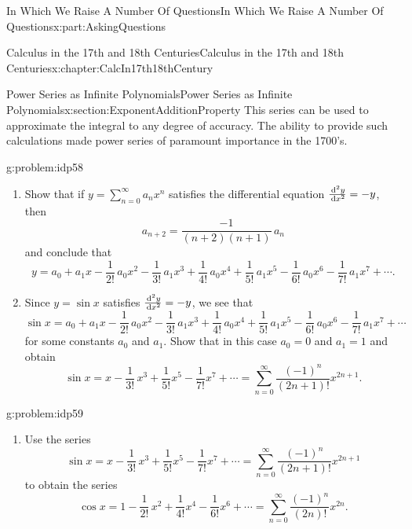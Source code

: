 \documentclass[oneside,10pt,]{book}
\numberwithin{equation}{section}
\newcommand{\dx}[1]{\,{\rm d}#1}
\begin{document}
\begin{partptx}{In Which We Raise A Number Of Questions}{}{In Which We Raise A Number Of Questions}{}{}{x:part:AskingQuestions}
\begin{chapterptx}{Calculus in the 17th and 18th Centuries}{}{Calculus in the 17th and 18th Centuries}{}{}{x:chapter:CalcIn17th18thCentury}
\begin{sectionptx}{Power Series as Infinite Polynomials}{}{Power Series as Infinite Polynomials}{}{}{x:section:ExponentAdditionProperty}
This series can be used to approximate the integral to any degree of accuracy. The ability to provide such calculations made power series of paramount importance in the 1700's.%
\begin{problem}{}{g:problem:idp58}%
\begin{enumerate}[font=\bfseries,label=(\alph*),ref=\alph*]
\item{}Show that if \(y=\sum_{n=0}^\infty a_nx^n\) satisfies the differential equation \(\frac{\dx^2y}{\dx{ x}^2}=-y\), then%
\begin{equation*}
a_{n+2}=\frac{-1}{\left(n+2\right)\left(n+1\right)}\,a_n
\end{equation*}
and conclude that%
\begin{equation*}
y=a_0+a_1x-\frac{1}{2!}\,a_0x^2-\frac{1}{3!}\,a_1x^3+\frac{1}{4!}\,a_0x^4+\frac{1}{5!}\,a_1x^5-\frac{1}{6!}\,a_0x^6-\frac{1}{7!}\,a_1x^7+\cdots\text{.}
\end{equation*}
%
\item{}Since \(y=\sin x\) satisfies \(\frac{\dx^2y}{\dx{
x}^2}=-y\), we see that%
\begin{equation*}
\sin x=a_0+a_1x-\frac{1}{2!}\,a_0x^2-\frac{1}{3!}\,a_1x^3+\frac{1}{4!}\,a_0x^4+\frac{1}{5!}\,a_1x^5-\frac{1}{6!}\,a_0x^6-\frac{1}{7!}\,a_1x^7+\cdots
\end{equation*}
for some constants \(a_0\) and \(a_1\).  Show that in this case \(a_0=0\) and \(a_1=1\) and obtain%
\begin{equation*}
\sin x=x-\frac{1}{3!}\,x^3+\frac{1}{5!}x^5-\frac{1}{7!}x^7+\cdots=\sum_{n=0}^\infty\frac{\left(-1\right)^n}{\left(2n+1\right)!}x^{2n+1}\text{.}
\end{equation*}
%
\end{enumerate}
\end{problem}
\begin{problem}{}{g:problem:idp59}%
\begin{enumerate}[font=\bfseries,label=(\alph*),ref=\alph*]
\item{}Use the series%
\begin{equation*}
\sin x=x-\frac{1}{3!}\,x^3+\frac{1}{5!}x^5-\frac{1}{7!}x^7+\cdots=\sum_{n=0}^\infty\frac{\left(-1\right)^n}{\left(2n+1\right)!}x^{2n+1}
\end{equation*}
to obtain the series%
\begin{equation*}
\cos x=1-\frac{1}{2!}\,x^2+\frac{1}{4!}x^4-\frac{1}{6!}x^6+\cdots=\sum_{n=0}^\infty\frac{\left(-1\right)^n}{\left(2n\right)!}x^{2n}\text{.}
\end{equation*}
%

\end{enumerate}
\end{problem}
\end{sectionptx}
\end{chapterptx}
\end{partptx}
\end{document}
